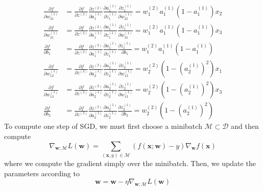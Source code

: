 \begin{solution}
\begin{align}
        \frac{\partial f}{\partial w_{21}^{(1)}} & = \frac{\partial f}{\partial z^{(2)}} \frac{\partial z^{(2)}}{\partial a^{(1)}_1} \frac{\partial a^{(1)}_1}{\partial z_1^{(1)}} \frac{\partial z_1^{(1)}}{\partial w_{21}^{(1)}} = w_1^{(2)} a_1^{(1)} (1 - a_1^{(1)}) x_2\\
        \frac{\partial f}{\partial w_{31}^{(1)}} & = \frac{\partial f}{\partial z^{(2)}} \frac{\partial z^{(2)}}{\partial a^{(1)}_1} \frac{\partial a^{(1)}_1}{\partial z_1^{(1)}} \frac{\partial z_1^{(1)}}{\partial w_{31}^{(1)}} = w_1^{(2)} a_1^{(1)} (1 - a_1^{(1)}) x_3\\
        \frac{\partial f}{\partial b_{1}} & = \frac{\partial f}{\partial z^{(2)}} \frac{\partial z^{(2)}}{\partial a^{(1)}_1} \frac{\partial a^{(1)}_1}{\partial z_1^{(1)}} \frac{\partial z_1^{(1)}}{\partial b_{1}}  = w_1^{(2)} a_1^{(1)} (1 - a_1^{(1)}) \\
        \frac{\partial f}{\partial w_{12}^{(1)}} & = \frac{\partial f}{\partial z^{(2)}} \frac{\partial z^{(2)}}{\partial a^{(1)}_2} \frac{\partial a^{(1)}_2}{\partial z_2^{(1)}} \frac{\partial z_2^{(1)}}{\partial w_{12}^{(1)}} = w_2^{(2)} (1 - (a_2^{(1)})^2 ) x_1\\
        \frac{\partial f}{\partial w_{13}^{(1)}} & = \frac{\partial f}{\partial z^{(2)}} \frac{\partial z^{(2)}}{\partial a^{(1)}_2} \frac{\partial a^{(1)}_2}{\partial z_2^{(1)}} \frac{\partial z_2^{(1)}}{\partial w_{13}^{(1)}} = w_2^{(2)} (1 - (a_2^{(1)})^2 ) x_3 \\
        \frac{\partial f}{\partial b_{2}} & = \frac{\partial f}{\partial z^{(2)}} \frac{\partial z^{(2)}}{\partial a^{(1)}_2} \frac{\partial a^{(1)}_2}{\partial z_2^{(1)}} \frac{\partial z_2^{(1)}}{\partial b_{2}} = w_2^{(2)} (1 - (a_2^{(1)})^2 )
    \end{align}
    To compute one step of SGD, we must first choose a minibatch $\mathcal{M} \subset \mathcal{D}$ and then compute 
    \begin{equation}
      \nabla_{\mathbf{w}; \mathcal{M}} L(\mathbf{w}) = \sum_{(\mathbf{x}, y) \in \mathcal{M}} (f(\mathbf{x}; \mathbf{w}) - y) \nabla_{\mathbf{w}} f(\mathbf{x})
    \end{equation}
    where we compute the gradient simply over the minibatch. Then, we update the parameters according to 
    \begin{equation}
      \mathbf{w} = \mathbf{w} - \eta \nabla_{\mathbf{w}; \mathcal{M}} L(\mathbf{w})
    \end{equation}
  \end{solution}

